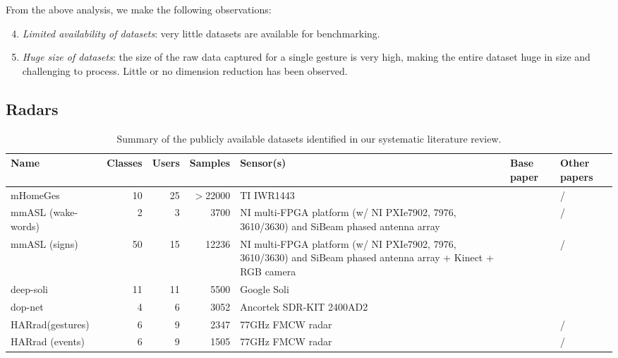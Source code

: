 From the above analysis, we make the following observations:
\begin{enumerate}
\setcounter{enumi}{3}
    \item \textit{Limited availability of datasets}: very little datasets are available for benchmarking.
    \item \textit{Huge size of datasets}: the size of the raw data captured for a single gesture is very high, making the entire dataset huge in size and challenging to process. Little or no dimension reduction has been observed.
\end{enumerate}

\subsection{Radars} \label{sec:state_of_the_art:radar:sensors}

\begin{table}[!t]
    \centering
    \footnotesize
    \begin{tabular}{>{\raggedright}p{1.8cm}rrr>{\raggedright}p{2.6cm}>{\raggedright}p{0.8cm}>{\raggedright\arraybackslash}p{0.9cm}}
        \toprule
        \textbf{Name} & \textbf{Classes} & \textbf{Users} & \textbf{Samples} & \textbf{Sensor(s)} & \textbf{Base paper} & \textbf{Other papers} \\
        \midrule
        mHomeGes & 10 & 25 & $>$22000 & TI IWR1443 & \cite{Liu:2020b} & /  \\
        \addlinespace[2pt]
        mmASL (wake-words) & 2 & 3 & 3700 & NI multi-FPGA platform (w/ NI PXIe7902, 7976, 3610/3630) and SiBeam phased antenna array & \cite{Santhalingam:2020b} & /  \\
        \addlinespace[2pt]
        mmASL (signs) & 50 & 15 & 12236 & NI multi-FPGA platform (w/ NI PXIe7902, 7976, 3610/3630) and SiBeam phased antenna array + Kinect + RGB camera  & \cite{Santhalingam:2020b} & /  \\
        \addlinespace[2pt]
        deep-soli & 11 & 11 & 5500 & Google Soli & \cite{Wang:2016} & \cite{Berenguer:2019}  \\
        \addlinespace[2pt]
        dop-net & 4 & 6 & 3052 & Ancortek SDR-KIT 2400AD2 & \cite{Ritchie:2020} & \cite{Bannon:2020}  \\
        \addlinespace[2pt]
        HARrad\newline(gestures) & 6 & 9 & 2347 & 77GHz FMCW radar & \cite{Vandersmissen:2020} & /  \\
        \addlinespace[2pt]
        HARrad (events) & 6 & 9 & 1505 & 77GHz FMCW radar & \cite{Vandersmissen:2020} & /  \\
        \bottomrule
    \end{tabular}
    \caption{Summary of the publicly available datasets identified in our systematic literature review.}
    \label{tab:state_of_the_art:radar-slr-datasets}
\end{table}

